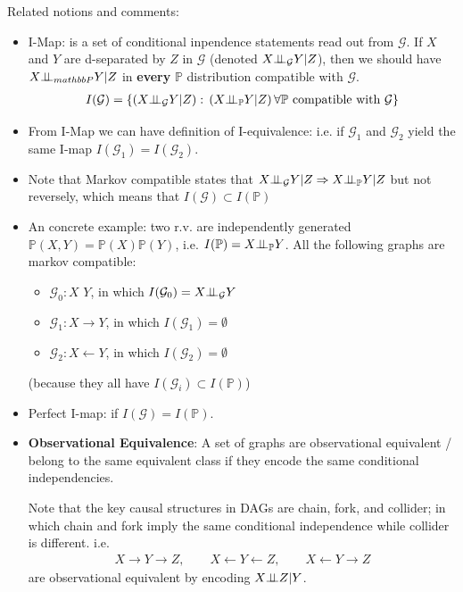 Related notions and comments:

\begin{itemize}[topsep=2pt,itemsep=0pt]
    \item I-Map: is a set of conditional inpendence statements read out from $ \mathcal{G} $. If $ X $ and $ Y $ are d-separated by $ Z $ in $ \mathcal{G} $ (denoted $ X\bot\!\!\!\bot_\mathcal{G} Y|Z $), then we should have $ X\bot\!\!\!\bot_{mathbb{P}} Y |Z$ in \textbf{every} $ \mathbb{P} $ distribution compatible with $ \mathcal{G} $.
    \begin{align*}
         I(\mathcal{G})=\left\{ (X\bot\!\!\!\bot_\mathcal{G}Y|Z):\, (X\bot\!\!\!\bot_\mathbb{P}Y|Z) \,\forall \mathbb{P}\text{ compatible with }\mathcal{G}  \right\}
    \end{align*}
    \item From I-Map we can have definition of I-equivalence: i.e. if $ \mathcal{G}_1 $ and $ \mathcal{G}_2 $ yield the same I-map $ I(\mathcal{G}_1)=I(\mathcal{G}_2) $.
    \item Note that Markov compatible states that $ X\bot\!\!\!\bot _\mathcal{G} Y|Z\Rightarrow  X\bot\!\!\!\bot _\mathbb{P} Y|Z $ but not reversely, which means that $ I(\mathcal{G})\subset I(\mathbb{P}) $
    \item An concrete example: two r.v. are independently generated $ \mathbb{P}\left( X,Y \right) =\mathbb{P}\left( X\right)\mathbb{P}\left( Y \right) $, i.e. $ I(\mathbb{P})= X\bot\!\!\!\bot_\mathbb{P} Y $. All the following graphs are markov compatible:
    \begin{itemize}[topsep=2pt,itemsep=0pt]
        \item $ \mathcal{G}_0: X\,\, Y $, in which $ I(\mathcal{G}_0) = X\bot\!\!\!\bot _\mathcal{G} Y $
        \item $ \mathcal{G}_1: X\to Y $, in which $ I(\mathcal{G}_1) = \emptyset  $
        \item $ \mathcal{G}_2: X\leftarrow Y $, in which $  I(\mathcal{G}_2) = \emptyset $
    \end{itemize}
    (because they all have $ I(\mathcal{G}_i)\subset I(\mathbb{P}) $)
    \item Perfect I-map: if $ I(\mathcal{G})=I(\mathbb{P}) $.
    \item \textbf{Observational Equivalence}: A set of graphs are observational equivalent / belong to the same equivalent class if they encode the same conditional independencies. 
    
    Note that the key causal structures in DAGs are chain, fork, and collider; in which chain and fork imply the same conditional independence while collider is different. i.e.
    \begin{align*}
        X\to Y\to Z,\qquad X\leftarrow Y\leftarrow Z,\qquad X\leftarrow Y \to Z 
    \end{align*}
    are observational equivalent by encoding $ X\bot\!\!\!\bot Z|Y $.
    

\end{itemize}
